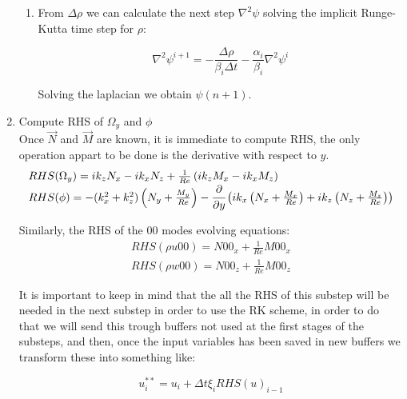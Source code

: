 \documentclass[titlepage,11pt]{article}
\newcommand\ppy[1]{\cfrac{\partial#1}{\partial y}} %
\begin{document}
\begin{enumerate}
\begin{enumerate}
	\item
	From $\Delta \rho$ we can calculate the next step $\nabla^2 \psi$ solving the implicit Runge-Kutta time step for $\rho$:

	\begin{equation}
		\nabla^2 \psi^{i+1}=-\frac{\Delta \rho}{\beta_i \Delta t}-\frac{\alpha_i}{\beta_i} \nabla^2 \psi^i
	\end{equation}

	Solving the laplacian we obtain $\psi(n+1)$.

\end{enumerate}

\item Compute RHS of $\Omega_y$ and $\phi$ \\
Once $\vec{N}$ and $\vec{M}$ are known, it is immediate to compute RHS, the only operation appart to be done is the derivative with respect to $y$.
		\begin{equation}
			\begin{array}{lcl}
				RHS(\Omega_y)=i k_z {N_x} - i k_x {N_z} + \frac{1}{Re} \left(  i k_z{M_x}-i k_x{M_z} \right)\\
				RHS(\phi)=-(k_x^2+k_z^2)\left( N_y+\frac{M_y}{Re} \right)-
					\ppy{} \left( i k_x \left( N_x+\frac{M_x}{Re} \right)+ i k_z \left( N_z+\frac{M_z}{Re} \right) \right)
			\end{array}
		\end{equation}

Similarly, the RHS of the 00 modes evolving equations:
		\begin{equation}
			\begin{array}{lcl}
				RHS(\rho u00)=N00_x+ \frac{1}{Re} M00_x\\
				RHS(\rho w00)= N00_z+\frac{1}{Re} M00_z
			\end{array}
		\end{equation}

It is important to keep in mind that the all the RHS of this substep will be needed in the next substep in order to use the RK scheme, in order to do that we will send this trough buffers not used at the first stages of the substeps, and then, once the input variables has been saved in new buffers we transform these into something like:

\begin{equation}
		u_i^{**}=u_i+\Delta t \xi_i RHS(u)_{i-1}
\end{equation}



\end{enumerate}
\end{document}
